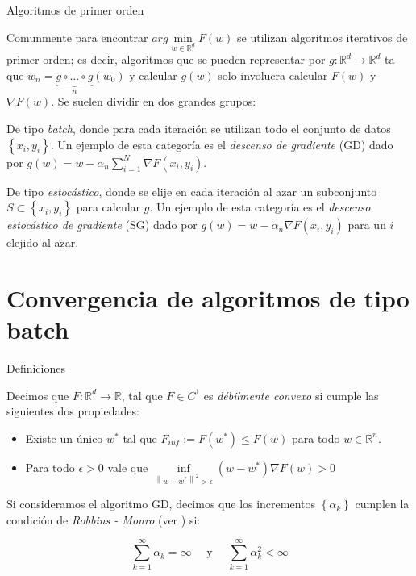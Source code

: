 \documentclass{beamer}
\newcommand{\R}{{\mathbb{R}}}
\newcommand{\norm}[1]{\left\lVert#1\right\rVert}
\newcommand{\sett}[1]{\left\lbrace#1\right\rbrace}
\begin{document}
\begin{frame}{Algoritmos de primer orden}

Comunmente para encontrar $arg\min\limits_{w \in \R^d}{F(w)}$ se utilizan algoritmos iterativos de primer orden; es decir, algoritmos que se pueden representar por $g : \R^d \rightarrow \R^d$ ta que $w_n = \underbrace{g \circ \dots \circ g}_{n} (w_0)$ y calcular $g(w)$ solo involucra calcular $F(w)$ y $\nabla F(w)$. Se suelen dividir en dos grandes grupos:

\pause

\bigskip

De tipo \textit{batch}, donde para cada iteraci\'on se utilizan todo el conjunto de datos $\sett{x_i, y_i}$. Un ejemplo de esta categor\'ia es el \textit{descenso de gradiente} (GD) dado por $g(w) = w - \alpha_n\sum\limits_{i=1}^{N} \nabla F(x_i, y_i)$.

\bigskip

De tipo \textit{estoc\'astico}, donde se elije en cada iteraci\'on al azar un subconjunto $S \subset \sett{x_i, y_i}$ para calcular $g$. Un ejemplo de esta categor\'ia es el \textit{descenso estoc\'astico de gradiente} (SG) dado por $g(w) = w - \alpha_n\nabla F(x_i, y_i)$ para un $i$ elejido al azar.

\end{frame}

\section{Convergencia de algoritmos de tipo batch}

\begin{frame}{Definiciones}


\begin{definition}
	Decimos que $F: \R^d \rightarrow \R$, tal que $F \in C^1$ es \textit{d\'ebilmente convexo} si cumple las siguientes dos propiedades:
	
	\begin{itemize}
		\item Existe un \'unico $w^*$ tal que $F_{inf} := F(w^*) \leq F(w)$ para todo $w \in \R^n$.
		\item Para todo $\epsilon > 0$ vale que $\inf\limits_{\norm{w-w^*}^2 > \epsilon} {\left(w - w^*\right) \nabla F(w) > 0}$
	\end{itemize}
	
\end{definition}

\smallskip

\begin{definition}
	Si consideramos el algoritmo GD, decimos que los incrementos $\sett{\alpha_k}$  cumplen la condici\'on de \textit{Robbins - Monro} (ver \cite{robbins:1951}) si:
	
	\begin{equation*}
	\sum\limits_{k=1}^{\infty} {\alpha_k} = \infty \quad \text{ y } \quad \sum\limits_{k=1}^{\infty} {\alpha_k^2} < \infty
	\end{equation*}
\end{definition}

\end{frame}
\end{document}
